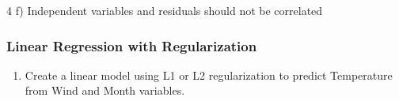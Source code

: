 \documentclass[11pt,]{article}
\newenvironment{Shaded}{\begin{snugshade}}{\end{snugshade}}
\newcommand{\CommentTok}[1]{\textcolor[rgb]{0.56,0.35,0.01}{\textit{#1}}}
\providecommand{\tightlist}{%
  \setlength{\itemsep}{0pt}\setlength{\parskip}{0pt}}
\begin{document}
4 f) Independent variables and residuals should not be correlated

\begin{Shaded}
\end{Shaded}

\hypertarget{linear-regression-with-regularization}{%
\subsubsection{Linear Regression with
Regularization}\label{linear-regression-with-regularization}}

\begin{enumerate}
\def\labelenumi{\arabic{enumi}.}
\setcounter{enumi}{4}
\tightlist
\item
  Create a linear model using L1 or L2 regularization to predict
  Temperature from Wind and Month variables.
\end{enumerate}
\end{document}
